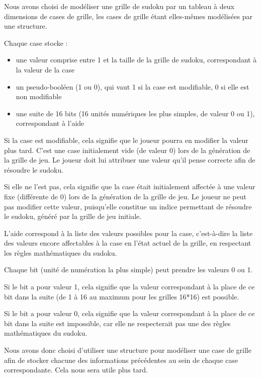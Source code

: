 \documentclass[a4paper, 12pt]{article}
\begin{document}
	\par Nous avons choisi de modéliser une grille de sudoku par un tableau à deux dimensions de cases de grille, les cases de grille étant elles-mêmes modélisées par une structure.
	\par Chaque case stocke :
	\begin{itemize}
	\item une valeur comprise entre 1 et la taille de la grille de sudoku, correspondant à la valeur de la case
	\item un pseudo-booléen (1 ou 0), qui vaut 1 si la case est modifiable, 0 si elle est non modifiable
	\item une suite de 16 bits (16 unités numériques les plus simples, de valeur 0 ou 1), correspondant à l'aide\\
	\end{itemize}
	\par Si la case est modifiable, cela signifie que le joueur pourra en modifier la valeur plus tard. C'est une case initialement vide (de valeur 0) lors de la génération de la grille de jeu. Le joueur doit lui attribuer une valeur qu'il pense correcte afin de résoudre le sudoku. 
	\par Si elle ne l'est pas, cela signifie que la case était initialement affectée à une valeur fixe (différente de 0) lors de la génération de la grille de jeu. Le joueur ne peut pas modifier cette valeur, puisqu'elle constitue un indice permettant de résoudre le sudoku, généré par la grille de jeu initiale.
	\\
	\par L'aide correspond à la liste des valeurs possibles pour la case, c'est-à-dire la liste des valeurs encore affectables à la case en l'état actuel de la grille, en respectant les règles mathématiques du sudoku.
	\par Chaque bit (unité de numération la plus simple) peut prendre les valeurs 0 ou 1. 
	\par Si le bit a pour valeur 1, cela signifie que la valeur correspondant à la place de ce bit dans la suite (de 1 à 16 au maximum pour les grilles 16*16) est possible.
	\par Si le bit a pour valeur 0, cela signifie que la valeur correspondant à la place de ce bit dans la suite est impossible, car elle ne respecterait pas une des règles mathématiques du sudoku.
	\\
	\par Nous avons donc choisi d'utiliser une structure pour modéliser une case de grille afin de stocker chacune des informations précédentes au sein de chaque case correspondante. Cela nous sera utile plus tard.\\
\end{document}
